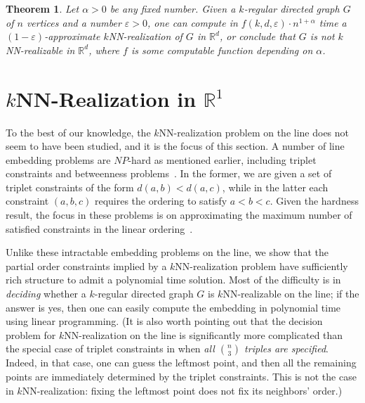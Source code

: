 \documentclass[11pt]{article}
\newtheorem{theorem}{Theorem}
\begin{document}
\begin{theorem}
Let $\alpha > 0$ be any fixed number.
Given a $k$-regular directed graph $G$ of $n$ vertices and a number $\varepsilon > 0$, one can compute in $f(k,d,\varepsilon) \cdot n^{1+\alpha}$ time a $(1-\varepsilon)$-approximate $k$NN-realization of $G$ in $\mathbb{R}^d$, or conclude that $G$ is not $k$NN-realizable in $\mathbb{R}^d$, where $f$ is some computable function depending on $\alpha$.
\end{theorem}


\newcommand{\coeff}[1]{C_{#1}}
\newcommand{\partcoeff}[2]{C_{#2}^{#1}}
\newcommand{\yleft}{y^-}
\newcommand{\yright}{y^+}

\section{\texorpdfstring{$k$}{k}NN-Realization in \texorpdfstring{$\mathbb{R}^1$}{R1}} \label{sec-1D}

To the best of our knowledge, the $k$NN-realization problem on the line does not seem to have been studied, and it is the focus of this section. A number of line embedding problems are $NP$-hard as mentioned earlier, including triplet constraints and betweenness problems~\cite{ChorSudan}. In the former, we are given a set of triplet constraints of the form $d(a,b) < d(a,c)$, while in the latter each constraint $(a,b,c)$ requires the ordering to satisfy $a < b < c$. Given the hardness result, the focus in these problems is on approximating the maximum number of satisfied constraints in the linear ordering~\cite{fan2020}. 

Unlike these intractable embedding problems on the line, we show that the partial order constraints implied by a $k$NN-realization problem have sufficiently  rich structure to admit a polynomial time solution. Most of the difficulty is in \emph{deciding} whether a $k$-regular directed graph $G$ is $k$NN-realizable on the line; if the answer is yes, then one can easily compute the embedding in polynomial time using linear programming.
(It is also worth pointing out that the decision problem for $k$NN-realization on the line is significantly more complicated than the special case of triplet constraints in \cite{fan2020} when \emph{all $\binom{n}{3}$ triples are specified}. Indeed, in that case, one can guess the leftmost point, and then all the remaining points are immediately determined by the triplet constraints. This is not the case in $k$NN-realization: fixing the leftmost point does not fix its neighbors' order.) 
\end{document}
